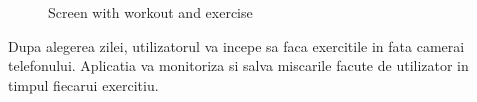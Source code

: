 \begin{figure}[!htb]
  \centering
  \hfill
    
    \caption{Screen with workout and exercise}
\end{figure}

Dupa alegerea zilei, utilizatorul va incepe sa faca exercitile in fata camerai telefonului.
Aplicatia va monitoriza si salva miscarile facute de utilizator in timpul fiecarui exercitiu.

